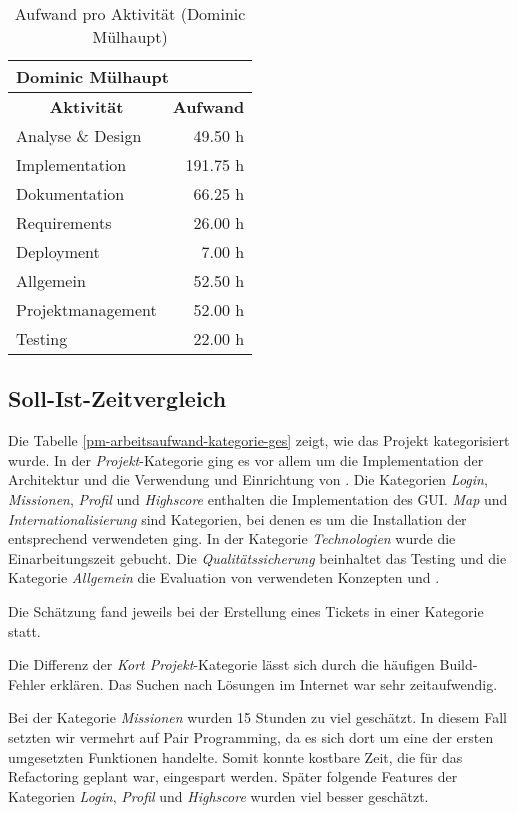 \begin{table}[H]
\centering
\label{pm-arbeitsaufwand-aktivität-dm}
\begin{tabular}{|l|r|}
\hline
\multicolumn{2}{|l|}{\textbf{Dominic Mülhaupt}} \\
\hline
\multicolumn{1}{|c|}{\textbf{Aktivität}} & \multicolumn{1}{|c|}{\textbf{Aufwand}} \\
\hline
Analyse \& Design & 49.50 h \\
\hline
Implementation & 191.75 h \\
\hline
Dokumentation & 66.25 h \\
\hline
Requirements & 26.00 h \\
\hline
Deployment & 7.00 h \\
\hline
Allgemein & 52.50 h \\
\hline
Projektmanagement & 52.00 h \\
\hline
Testing & 22.00 h \\
\hline
\end{tabular}
\caption{Aufwand pro Aktivität (Dominic Mülhaupt)}
\end{table}


\subsection{Soll-Ist-Zeitvergleich}
Die Tabelle \ref{pm-arbeitsaufwand-kategorie-ges} zeigt, wie das Projekt kategorisiert wurde. 
In der \kort{} \textit{Projekt}-Kategorie ging es vor allem um die Implementation der Architektur und die Verwendung und Einrichtung von . 
Die Kategorien \textit{Login}, \textit{Missionen}, \textit{Profil} und \textit{Highscore} enthalten die Implementation des \gls{GUI}. 
\textit{Map} und \textit{Internationalisierung} sind Kategorien, bei denen es um die Installation der entsprechend verwendeten  ging. 
In der Kategorie \textit{Technologien} wurde die Einarbeitungszeit gebucht. 
Die \textit{Qualitätssicherung} beinhaltet das Testing und die Kategorie \textit{Allgemein} die Evaluation von verwendeten Konzepten und .

Die Schätzung fand jeweils bei der Erstellung eines Tickets in einer Kategorie statt. 

Die Differenz der \textit{Kort Projekt}-Kategorie lässt sich durch die häufigen Build-Fehler erklären. 
Das Suchen nach Lösungen im Internet war sehr zeitaufwendig. 

Bei der Kategorie \textit{Missionen} wurden 15 Stunden zu viel geschätzt. 
In diesem Fall setzten wir vermehrt auf \gls{Pair Programming}, da es sich dort um eine der ersten umgesetzten Funktionen handelte.
Somit konnte kostbare Zeit, die für das Refactoring geplant war, eingespart werden. 
Später folgende Features der Kategorien \textit{Login}, \textit{Profil} und \textit{Highscore} wurden viel besser geschätzt.

